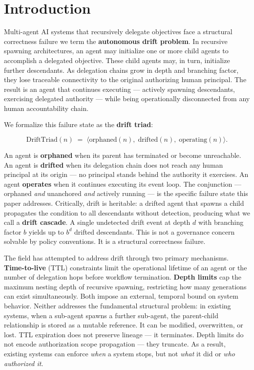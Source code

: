 \section{Introduction}
\label{sec:introduction}

Multi-agent AI systems that recursively delegate objectives face a structural correctness failure we term the \textbf{autonomous drift problem}. In recursive spawning architectures, an agent may initialize one or more child agents to accomplish a delegated objective. These child agents may, in turn, initialize further descendants. As delegation chains grow in depth and branching factor, they lose traceable connectivity to the original authorizing human principal. The result is an agent that continues executing — actively spawning descendants, exercising delegated authority — while being operationally disconnected from any human accountability chain.

We formalize this failure state as the \textbf{drift triad}:

\begin{equation}
\text{DriftTriad}(n) \;=\; \bigl\langle \text{orphaned}(n),\; \text{drifted}(n),\; \text{operating}(n) \bigr\rangle .
\label{eq:intro-drift-triad}
\end{equation}

An agent is \textbf{orphaned} when its parent has terminated or become unreachable. An agent is \textbf{drifted} when its delegation chain does not reach any human principal at its origin — no principal stands behind the authority it exercises. An agent \textbf{operates} when it continues executing its event loop. The conjunction — orphaned \emph{and} unanchored \emph{and} actively running — is the specific failure state this paper addresses. Critically, drift is heritable: a drifted agent that spawns a child propagates the condition to all descendants without detection, producing what we call a \textbf{drift cascade}. A single undetected drift event at depth $d$ with branching factor $b$ yields up to $b^d$ drifted descendants. This is not a governance concern solvable by policy conventions. It is a structural correctness failure.

The field has attempted to address drift through two primary mechanisms. \textbf{Time-to-live} (TTL) constraints limit the operational lifetime of an agent or the number of delegation hops before workflow termination. \textbf{Depth limits} cap the maximum nesting depth of recursive spawning, restricting how many generations can exist simultaneously. Both impose an external, temporal bound on system behavior. Neither addresses the fundamental structural problem: in existing systems, when a sub-agent spawns a further sub-agent, the parent-child relationship is stored as a mutable reference. It can be modified, overwritten, or lost. TTL expiration does not preserve lineage — it terminates. Depth limits do not encode authorization scope propagation — they truncate. As a result, existing systems can enforce \emph{when} a system stops, but not \emph{what} it did or \emph{who authorized it}.

